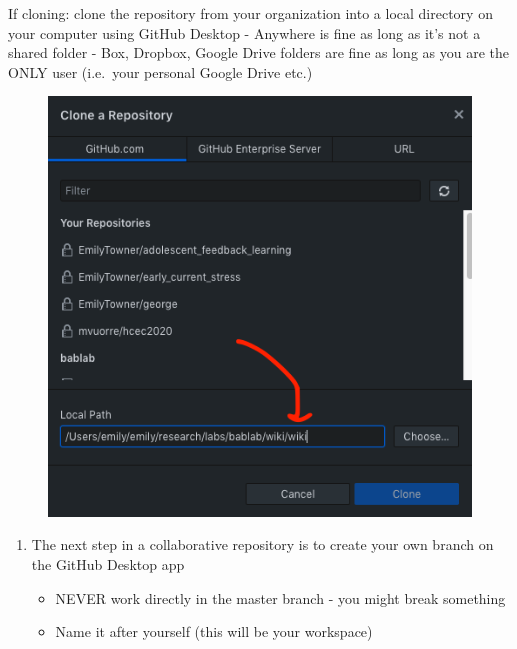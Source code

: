 \documentclass[]{book}
\providecommand{\tightlist}{%
  \setlength{\itemsep}{0pt}\setlength{\parskip}{0pt}}
\begin{document}
If cloning: clone the repository from your organization into a local directory on your computer using GitHub Desktop
- Anywhere is fine as long as it's not a shared folder
- Box, Dropbox, Google Drive folders are fine as long as you are the ONLY user (i.e.~your personal Google Drive etc.)

\begin{figure}
\centering
\includegraphics{images/research_protocols/github/22.png}
\caption{}
\end{figure}

\begin{enumerate}
\def\labelenumi{\arabic{enumi}.}
\setcounter{enumi}{1}
\tightlist
\item
  The next step in a collaborative repository is to create your own branch on the GitHub Desktop app

  \begin{itemize}
  \tightlist
  \item
    NEVER work directly in the master branch - you might break something
  \item
    Name it after yourself (this will be your workspace)
  \end{itemize}
\end{enumerate}
\end{document}
